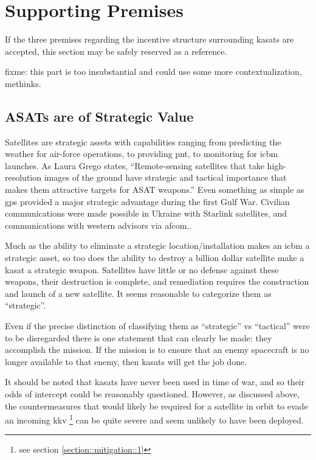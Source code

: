 \section{Supporting Premises}
\label{section::support}

If the three premises regarding the incentive structure surrounding
\acp{kasat} are accepted, this section may be safely reserved as a
reference.

fixme: this part is too insubstantial and could use some more
contextualization, methinks.

\subsection{ASATs are of Strategic Value}

Satellites are strategic assets with capabilities ranging from
predicting the weather for air-force operations, to providing
\ac{pnt}, to monitoring for \ac{icbm} launches.  As Laura Grego
states, ``Remote-sensing satellites that take high-resolution images
of the ground have strategic and tactical importance that makes them
attractive targets for ASAT weapons.''\cite[p16]{grego} Even something
as simple as \ac{gps} provided a major strategic advantage during the
first Gulf War.\cite{gps-gulf} Civilian communications were made
possible in Ukraine with Starlink satellites, and communications with
western advisors via \ac{afcom}.\cite{xxx}.

Much as the ability to eliminate a strategic location/installation
makes an \ac{icbm} a strategic asset, so too does the ability to
destroy a billion dollar satellite make a \ac{kasat} a strategic
weapon.  Satellites have little or no defense against these weapons,
their destruction is complete, and remediation requires the
construction and launch of a new satellite.  It seems reasonable to
categorize them as ``strategic''.

Even if the precise distinction of classifying them as ``strategic''
vs ``tactical'' were to be disregarded there is one statement that can
clearly be made: they accomplish the mission.  If the mission is to
ensure that an enemy spacecraft is no longer available to that enemy,
then \acp{kasat} will get the job done.

It should be noted that \acp{kasat} have never been used in time of
war\cite{brian}, and so their odds of intercept could be reasonably
questioned.  However, as discussed above, the countermeasures that
would likely be required for a satellite in orbit to evade an incoming
\ac{kkv} \footnote{see section \ref{section::mitigation::1}} can be
quite severe and seem unlikely to have been deployed.

